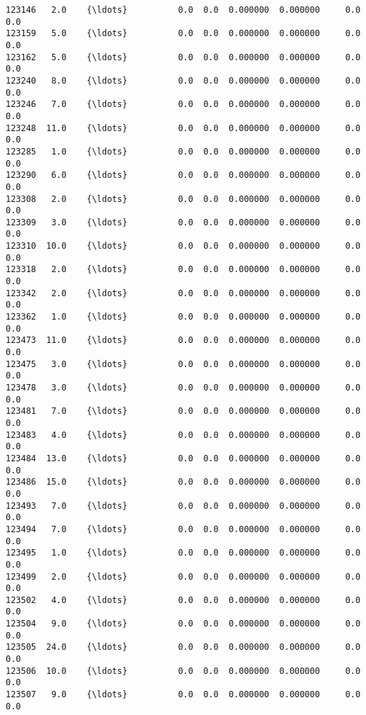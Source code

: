 \documentclass[11pt]{article}
\begin{document}
\begin{Verbatim}[commandchars=\\\{\}]
123146   2.0    {\ldots}          0.0  0.0  0.000000  0.000000     0.0    0.0   
123159   5.0    {\ldots}          0.0  0.0  0.000000  0.000000     0.0    0.0   
123162   5.0    {\ldots}          0.0  0.0  0.000000  0.000000     0.0    0.0   
123240   8.0    {\ldots}          0.0  0.0  0.000000  0.000000     0.0    0.0   
123246   7.0    {\ldots}          0.0  0.0  0.000000  0.000000     0.0    0.0   
123248  11.0    {\ldots}          0.0  0.0  0.000000  0.000000     0.0    0.0   
123285   1.0    {\ldots}          0.0  0.0  0.000000  0.000000     0.0    0.0   
123290   6.0    {\ldots}          0.0  0.0  0.000000  0.000000     0.0    0.0   
123308   2.0    {\ldots}          0.0  0.0  0.000000  0.000000     0.0    0.0   
123309   3.0    {\ldots}          0.0  0.0  0.000000  0.000000     0.0    0.0   
123310  10.0    {\ldots}          0.0  0.0  0.000000  0.000000     0.0    0.0   
123318   2.0    {\ldots}          0.0  0.0  0.000000  0.000000     0.0    0.0   
123342   2.0    {\ldots}          0.0  0.0  0.000000  0.000000     0.0    0.0   
123362   1.0    {\ldots}          0.0  0.0  0.000000  0.000000     0.0    0.0   
123473  11.0    {\ldots}          0.0  0.0  0.000000  0.000000     0.0    0.0   
123475   3.0    {\ldots}          0.0  0.0  0.000000  0.000000     0.0    0.0   
123478   3.0    {\ldots}          0.0  0.0  0.000000  0.000000     0.0    0.0   
123481   7.0    {\ldots}          0.0  0.0  0.000000  0.000000     0.0    0.0   
123483   4.0    {\ldots}          0.0  0.0  0.000000  0.000000     0.0    0.0   
123484  13.0    {\ldots}          0.0  0.0  0.000000  0.000000     0.0    0.0   
123486  15.0    {\ldots}          0.0  0.0  0.000000  0.000000     0.0    0.0   
123493   7.0    {\ldots}          0.0  0.0  0.000000  0.000000     0.0    0.0   
123494   7.0    {\ldots}          0.0  0.0  0.000000  0.000000     0.0    0.0   
123495   1.0    {\ldots}          0.0  0.0  0.000000  0.000000     0.0    0.0   
123499   2.0    {\ldots}          0.0  0.0  0.000000  0.000000     0.0    0.0   
123502   4.0    {\ldots}          0.0  0.0  0.000000  0.000000     0.0    0.0   
123504   9.0    {\ldots}          0.0  0.0  0.000000  0.000000     0.0    0.0   
123505  24.0    {\ldots}          0.0  0.0  0.000000  0.000000     0.0    0.0   
123506  10.0    {\ldots}          0.0  0.0  0.000000  0.000000     0.0    0.0   
123507   9.0    {\ldots}          0.0  0.0  0.000000  0.000000     0.0    0.0   


\end{Verbatim}
\end{document}
